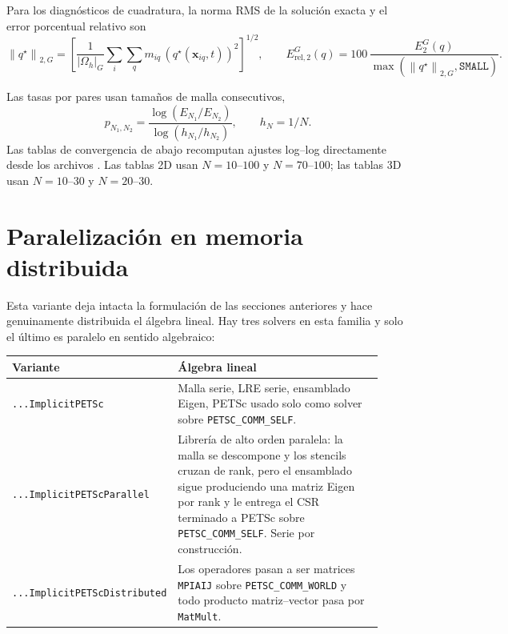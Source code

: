 \documentclass[11pt,a4paper]{article}
\newcommand{\code}[1]{\texttt{\small #1}}
\newcommand{\norm}[1]{\left\lVert #1 \right\rVert}
\begin{document}
Para los diagnósticos de cuadratura, la norma RMS de la solución exacta y el error porcentual
relativo son
\begin{equation}
  \norm{q^\star}_{2,G}
  =
  \left[
  \frac{1}{|\Omega_h|_G}
  \sum_i\sum_q m_{iq}\,
  \left(q^\star(\mathbf{x}_{iq},t)\right)^2
  \right]^{1/2},
  \qquad
  E_{\mathrm{rel},2}^{G}(q)
  =
  100\,\frac{E_2^G(q)}{\max(\norm{q^\star}_{2,G},\texttt{SMALL})}.
\end{equation}

Las tasas por pares usan tamaños de malla consecutivos,
\begin{equation}
p_{N_1,N_2} = \frac{\log(E_{N_1}/E_{N_2})}{\log(h_{N_1}/h_{N_2})}, \qquad h_N=1/N.
\end{equation}
Las tablas de convergencia de abajo recomputan ajustes log--log directamente desde los
archivos . Las tablas 2D usan $N=10$--$100$ y $N=70$--$100$; las tablas 3D
usan $N=10$--$30$ y $N=20$--$30$.


\section{Paralelización en memoria distribuida}
\label{sec:distributed}

Esta variante deja intacta la formulación de las secciones anteriores y hace
genuinamente distribuida el álgebra lineal. Hay tres solvers en esta familia y
solo el último es paralelo en sentido algebraico:

\begin{center}
\begin{tabular}{@{}p{0.30\linewidth}p{0.62\linewidth}@{}}
\toprule
Variante & Álgebra lineal \\
\midrule
\code{...ImplicitPETSc} & Malla serie, LRE serie, ensamblado Eigen, PETSc usado
   solo como solver sobre \code{PETSC\_COMM\_SELF}. \\
\code{...ImplicitPETScParallel} & Librería de alto orden paralela: la malla se
   descompone y los stencils cruzan de rank, pero el ensamblado sigue
   produciendo una matriz Eigen por rank y le entrega el CSR terminado a PETSc
   sobre \code{PETSC\_COMM\_SELF}. Serie por construcción. \\
\code{...ImplicitPETScDistributed} & Los operadores pasan a ser matrices
   \code{MPIAIJ} sobre \code{PETSC\_COMM\_WORLD} y todo producto
   matriz--vector pasa por \code{MatMult}. \\
\bottomrule
\end{tabular}
\end{center}
\end{document}
